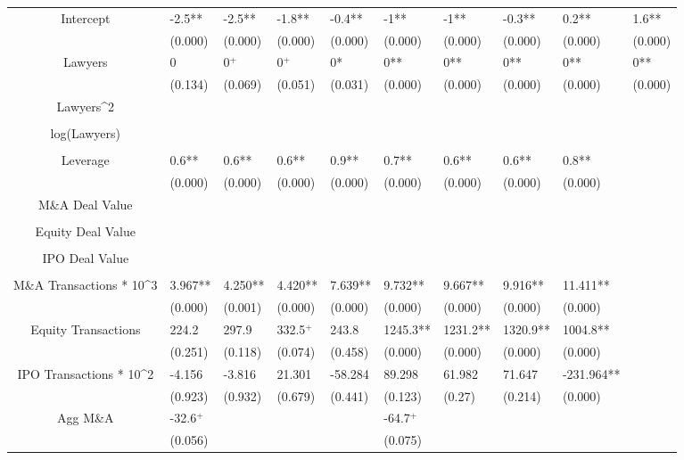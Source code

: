\documentclass{article}
\begin{document}
\begin{table}[H]
\begin{tabular}{|clllllllll|}
Intercept & -2.5** & -2.5** & -1.8** & -0.4** & -1** & -1** & -0.3** & 0.2** & 1.6** \\ 
   & (0.000) & (0.000) & (0.000) & (0.000) & (0.000) & (0.000) & (0.000) & (0.000) & (0.000) \\ 
  Lawyers & 0 & 0$^{+}$ & 0$^{+}$ & 0* & 0** & 0** & 0** & 0** & 0** \\ 
   & (0.134) & (0.069) & (0.051) & (0.031) & (0.000) & (0.000) & (0.000) & (0.000) & (0.000) \\ 
  Lawyers^2 &  &  &  &  &  &  &  &  &  \\ 
   &  &  &  &  &  &  &  &  &  \\ 
  log(Lawyers) &  &  &  &  &  &  &  &  &  \\ 
   &  &  &  &  &  &  &  &  &  \\ 
  Leverage & 0.6** & 0.6** & 0.6** & 0.9** & 0.7** & 0.6** & 0.6** & 0.8** &  \\ 
   & (0.000) & (0.000) & (0.000) & (0.000) & (0.000) & (0.000) & (0.000) & (0.000) &  \\ 
  M\&A Deal Value &  &  &  &  &  &  &  &  &  \\ 
   &  &  &  &  &  &  &  &  &  \\ 
  Equity Deal Value &  &  &  &  &  &  &  &  &  \\ 
   &  &  &  &  &  &  &  &  &  \\ 
  IPO Deal Value &  &  &  &  &  &  &  &  &  \\ 
   &  &  &  &  &  &  &  &  &  \\ 
  M\&A Transactions * 10^3 & 3.967** & 4.250** & 4.420** & 7.639** & 9.732** & 9.667** & 9.916** & 11.411** &  \\ 
   & (0.000) & (0.001) & (0.000) & (0.000) & (0.000) & (0.000) & (0.000) & (0.000) &  \\ 
  Equity Transactions & 224.2 & 297.9 & 332.5$^{+}$ & 243.8 & 1245.3** & 1231.2** & 1320.9** & 1004.8** &  \\ 
   & (0.251) & (0.118) & (0.074) & (0.458) & (0.000) & (0.000) & (0.000) & (0.000) &  \\ 
  IPO Transactions * 10^2 & -4.156 & -3.816 & 21.301 & -58.284 & 89.298 & 61.982 & 71.647 & -231.964** &  \\ 
   & (0.923) & (0.932) & (0.679) & (0.441) & (0.123) & (0.27) & (0.214) & (0.000) &  \\ 
  Agg M\&A & -32.6$^{+}$ &  &  &  & -64.7$^{+}$ &  &  &  &  \\ 
   & (0.056) &  &  &  & (0.075) &  &  &  &  \\ 

\end{tabular}
\end{table}
\end{document}
